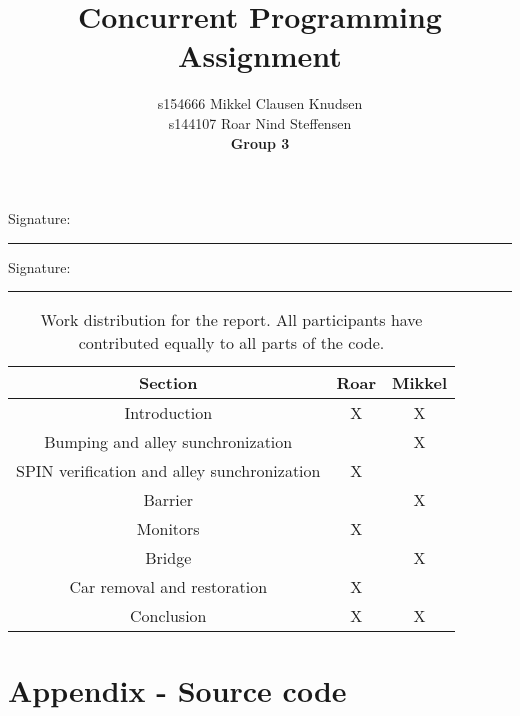 

\title{Concurrent Programming Assignment}
\author{s154666 Mikkel Clausen Knudsen\\
        s144107 Roar Nind Steffensen\\
        \textbf{Group 3}}
\date{}


\clearpage
\maketitle
\thispagestyle{empty}
\vspace{-1cm}
\tableofcontents

\vfill
\begin{multicols}{2}
Signature: \rule{0.75\linewidth}{.4pt}

Signature: \rule{0.75\linewidth}{.4pt}
\end{multicols}


\begin{table}
    \centering
    \begin{tabular}{|c|c|c|} \hline
        Section & Roar & Mikkel \\ \hline
        Introduction & X & X \\ \hline
        Bumping and alley sunchronization & & X \\ \hline
        SPIN verification and alley sunchronization & X & \\ \hline
        Barrier & & X \\ \hline
        Monitors & X & \\ \hline
        Bridge & & X \\ \hline
        Car removal and restoration & X & \\ \hline 
        Conclusion & X & X \\ \hline 
    \end{tabular}
    \caption{Work distribution for the report. All participants have contributed equally to all parts of the code.}
    \label{tab:work_distribution}
\end{table}

\newpage
\setcounter{page}{1}












\newpage
\section*{Appendix - Source code}



